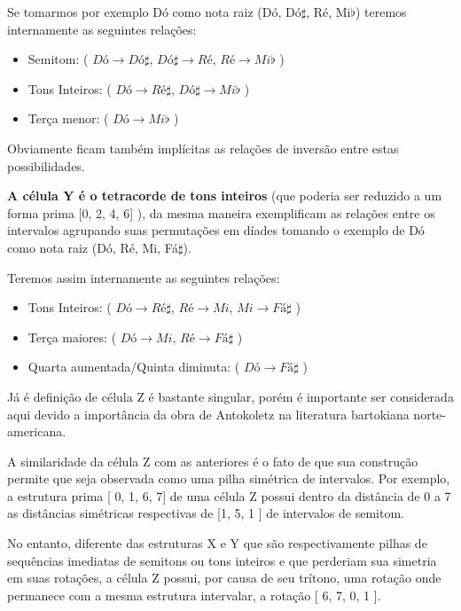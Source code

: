 \documentclass[
	12pt,				%
	openright,			%
	twoside,			%
	a4paper,			%
	english,			%
	french,				%
	spanish,			%
	brazil				%
	]{abntex2}
\begin{document}
Se tomarmos por exemplo Dó como nota raiz (Dó, Dó$\sharp$, Ré, Mi$\flat$) teremos internamente as seguintes relações:


\begin{itemize}
\item Semitom: ( $Dó \rightarrow Dó\sharp$, $Dó\sharp \rightarrow Ré$, $Ré \rightarrow Mi\flat$ ) 

\item Tons Inteiros: ( $Dó \rightarrow Ré\sharp$, $Dó\sharp \rightarrow Mi\flat$ )

\item Terça menor: ( $Dó \rightarrow Mi\flat$ )
\end{itemize}

Obviamente ficam também implícitas as relações de inversão entre estas possibilidades.

\textbf{A célula Y é o tetracorde de tons inteiros} (que poderia ser reduzido a um forma prima [0, 2, 4, 6] ), da mesma maneira  exemplificam as relações entre os intervalos agrupando suas permutações em díades tomando o exemplo de Dó como nota raiz (Dó, Ré, Mi, Fá$\sharp$). 

Teremos assim internamente as seguintes relações:

\begin{itemize}
\item Tons Inteiros: ( $Dó \rightarrow Ré\sharp$, $Ré \rightarrow Mi$, $Mi \rightarrow Fá\sharp$ ) 

\item Terça maiores: ( $Dó \rightarrow Mi$, $Ré \rightarrow Fá\sharp$ )

\item Quarta aumentada/Quinta diminuta: ( $Dó \rightarrow Fá\sharp$ )
\end{itemize}


Já é definição de célula Z é bastante singular, porém é importante ser considerada aqui devido a importância da obra de Antokoletz na literatura bartokiana norte-americana. 

A similaridade da célula Z com as anteriores é o fato de que sua construção permite que seja observada como uma pilha simétrica de intervalos. Por exemplo, a estrutura prima [ 0, 1, 6, 7] de uma célula Z possui dentro da distância de 0 a 7 as distâncias simétricas respectivas de [1, 5, 1 ] de intervalos de semitom. 

No entanto, diferente das estruturas X e Y que são respectivamente pilhas de sequências imediatas de semitons ou tons inteiros e que perderiam sua simetria em suas rotações, a célula Z possui, por causa de seu trítono, uma rotação onde permanece com a mesma estrutura intervalar, a rotação [ 6, 7, 0, 1 ]. 
\end{document}

